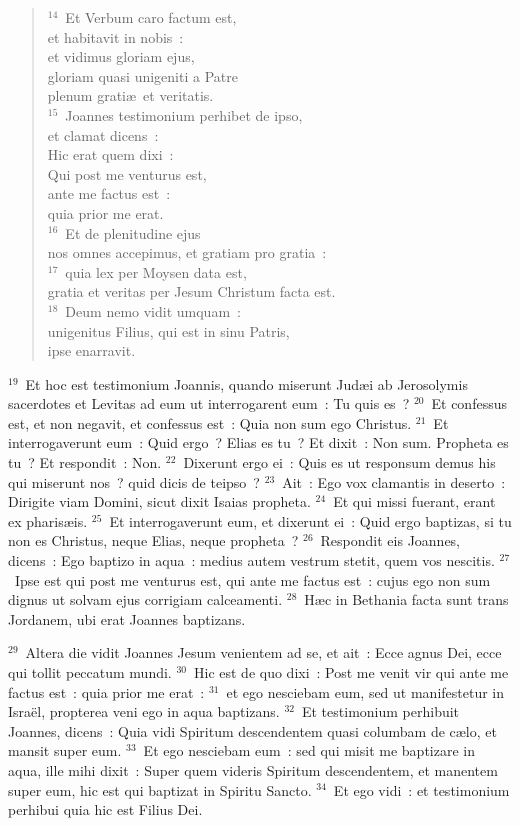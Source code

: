\begin{verse}
${}^{14}$~Et Verbum caro factum est,\\ et habitavit in nobis~:\\ et vidimus gloriam ejus,\\ gloriam quasi unigeniti a Patre\\ plenum grati\ae\ et veritatis.\\
${}^{15}$~Joannes testimonium perhibet de ipso,\\ et clamat dicens~:\\ Hic erat quem dixi~:\\ Qui post me venturus est,\\ ante me factus est~:\\ quia prior me erat.\\
${}^{16}$~Et de plenitudine ejus\\ nos omnes accepimus, et gratiam pro gratia~:\\
${}^{17}$~quia lex per Moysen data est,\\ gratia et veritas per Jesum Christum facta est.\\
${}^{18}$~Deum nemo vidit umquam~:\\ unigenitus Filius, qui est in sinu Patris,\\ ipse enarravit.\end{verse}


${}^{19}$~Et hoc est testimonium Joannis, quando miserunt Jud\ae i ab Jerosolymis sacerdotes et Levitas ad eum ut interrogarent eum~: Tu quis es~?
${}^{20}$~Et confessus est, et non negavit, et confessus est~: Quia non sum ego Christus.
${}^{21}$~Et interrogaverunt eum~: Quid ergo~? Elias es tu~? Et dixit~: Non sum. Propheta es tu~? Et respondit~: Non.
${}^{22}$~Dixerunt ergo ei~: Quis es ut responsum demus his qui miserunt nos~? quid dicis de teipso~?
${}^{23}$~Ait~: Ego vox clamantis in deserto~: Dirigite viam Domini, sicut dixit Isaias propheta.
${}^{24}$~Et qui missi fuerant, erant ex pharis\ae is.
${}^{25}$~Et interrogaverunt eum, et dixerunt ei~: Quid ergo baptizas, si tu non es Christus, neque Elias, neque propheta~?
${}^{26}$~Respondit eis Joannes, dicens~: Ego baptizo in aqua~: medius autem vestrum stetit, quem vos nescitis.
${}^{27}$~Ipse est qui post me venturus est, qui ante me factus est~: cujus ego non sum dignus ut solvam ejus corrigiam calceamenti.
${}^{28}$~H\ae c in Bethania facta sunt trans Jordanem, ubi erat Joannes baptizans.


${}^{29}$~Altera die vidit Joannes Jesum venientem ad se, et ait~: Ecce agnus Dei, ecce qui tollit peccatum mundi.
${}^{30}$~Hic est de quo dixi~: Post me venit vir qui ante me factus est~: quia prior me erat~:
${}^{31}$~et ego nesciebam eum, sed ut manifestetur in Isra\"el, propterea veni ego in aqua baptizans.
${}^{32}$~Et testimonium perhibuit Joannes, dicens~: Quia vidi Spiritum descendentem quasi columbam de c\ae lo, et mansit super eum.
${}^{33}$~Et ego nesciebam eum~: sed qui misit me baptizare in aqua, ille mihi dixit~: Super quem videris Spiritum descendentem, et manentem super eum, hic est qui baptizat in Spiritu Sancto.
${}^{34}$~Et ego vidi~: et testimonium perhibui quia hic est Filius Dei.


